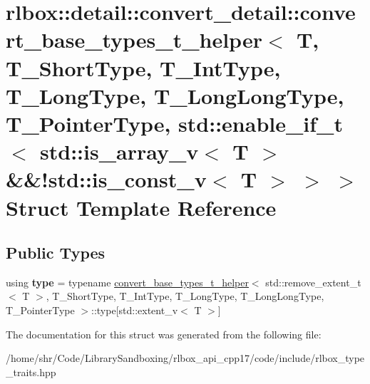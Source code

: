 \hypertarget{structrlbox_1_1detail_1_1convert__detail_1_1convert__base__types__t__helper_3_01T_00_01T__ShortT9669a45f33d18c9be6a22efe2b66d10c}{}\section{rlbox\+:\+:detail\+:\+:convert\+\_\+detail\+:\+:convert\+\_\+base\+\_\+types\+\_\+t\+\_\+helper$<$ T, T\+\_\+\+Short\+Type, T\+\_\+\+Int\+Type, T\+\_\+\+Long\+Type, T\+\_\+\+Long\+Long\+Type, T\+\_\+\+Pointer\+Type, std\+:\+:enable\+\_\+if\+\_\+t$<$ std\+:\+:is\+\_\+array\+\_\+v$<$ T $>$ \&\&!std\+:\+:is\+\_\+const\+\_\+v$<$ T $>$ $>$ $>$ Struct Template Reference}
\label{structrlbox_1_1detail_1_1convert__detail_1_1convert__base__types__t__helper_3_01T_00_01T__ShortT9669a45f33d18c9be6a22efe2b66d10c}
\subsection*{Public Types}
\begin{DoxyCompactItemize}
\item 
\mbox{\label{structrlbox_1_1detail_1_1convert__detail_1_1convert__base__types__t__helper_3_01T_00_01T__ShortT9669a45f33d18c9be6a22efe2b66d10c_a502367a191bcee084370b22af09dd63e}} 
using {\bfseries type} = typename \hyperlink{structrlbox_1_1detail_1_1convert__detail_1_1convert__base__types__t__helper}{convert\+\_\+base\+\_\+types\+\_\+t\+\_\+helper}$<$ std\+::remove\+\_\+extent\+\_\+t$<$ T $>$, T\+\_\+\+Short\+Type, T\+\_\+\+Int\+Type, T\+\_\+\+Long\+Type, T\+\_\+\+Long\+Long\+Type, T\+\_\+\+Pointer\+Type $>$\+::type\mbox{[}std\+::extent\+\_\+v$<$ T $>$\mbox{]}
\end{DoxyCompactItemize}


The documentation for this struct was generated from the following file\+:\begin{DoxyCompactItemize}
\item 
/home/shr/\+Code/\+Library\+Sandboxing/rlbox\+\_\+api\+\_\+cpp17/code/include/rlbox\+\_\+type\+\_\+traits.\+hpp\end{DoxyCompactItemize}
